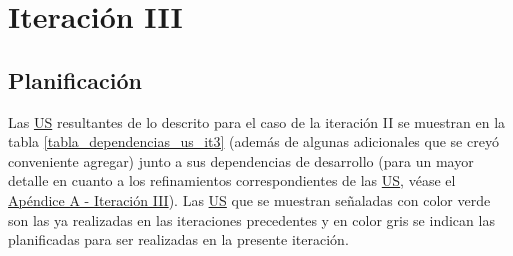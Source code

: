 \documentclass[a4paper, 12pt,twoside]{report}  %
\numberwithin{equation}{subsection} %
\begin{document}
\section{Iteración III}
\label{descripcion_iteracion_III}
\subsection{Planificación}
Las \hyperlink{US}{US} resultantes de lo descrito para el caso de la iteración II se muestran en la tabla \ref{tabla_dependencias_us_it3} (además de algunas adicionales que se creyó conveniente agregar) junto a sus dependencias de desarrollo (para un mayor detalle en cuanto a los refinamientos correspondientes de las \hyperlink{US}{US}, véase el \hyperlink{apendice_a_III}{Apéndice A - Iteración III}). Las \hyperlink{US}{US} que se muestran señaladas con color verde son las ya realizadas en las iteraciones precedentes y en color gris se indican las planificadas para ser realizadas en la presente iteración.
\end{document}
